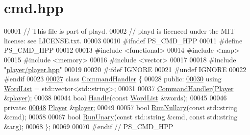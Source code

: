 \hypertarget{cmd_8hpp_source}{\section{cmd.\+hpp}
\label{cmd_8hpp_source}
}

\begin{DoxyCode}
00001 \textcolor{comment}{// This file is part of playd.}
00002 \textcolor{comment}{// playd is licenced under the MIT license: see LICENSE.txt.}
00003 
00010 \textcolor{preprocessor}{#ifndef PS\_CMD\_HPP}
00011 \textcolor{preprocessor}{#define PS\_CMD\_HPP}
00012 
00013 \textcolor{preprocessor}{#include <functional>}
00014 \textcolor{preprocessor}{#include <map>}
00015 \textcolor{preprocessor}{#include <memory>}
00016 \textcolor{preprocessor}{#include <vector>}
00017 
00018 \textcolor{preprocessor}{#include "\hyperlink{player_8hpp}{player/player.hpp}"}
00019 
00020 \textcolor{preprocessor}{#ifdef IGNORE}
00021 \textcolor{preprocessor}{#undef IGNORE}
00022 \textcolor{preprocessor}{#endif}
00023 
\hypertarget{cmd_8hpp_source_l00027}{}\hyperlink{classCommandHandler}{00027} \textcolor{keyword}{class }\hyperlink{classCommandHandler}{CommandHandler} \{
00028 \textcolor{keyword}{public}:
\hypertarget{cmd_8hpp_source_l00030}{}\hyperlink{classCommandHandler_ae6cc650f171966041b385c8a4a766639}{00030}     \textcolor{keyword}{using} \hyperlink{classCommandHandler_ae6cc650f171966041b385c8a4a766639}{WordList} = std::vector<std::string>;
00031 
00037     \hyperlink{classCommandHandler_ae4d47b90e2cf2ab6d514576fedeb2192}{CommandHandler}(\hyperlink{classPlayer}{Player} &\hyperlink{classCommandHandler_a398ba97a0625f5fbc3ced6679cfd3766}{player});
00038 
00044     \textcolor{keywordtype}{bool} \hyperlink{classCommandHandler_abc1ad0dfbff50db168d0a65cf05b169e}{Handle}(\textcolor{keyword}{const} \hyperlink{classCommandHandler_ae6cc650f171966041b385c8a4a766639}{WordList} &words);
00045 
00046 \textcolor{keyword}{private}:
\hypertarget{cmd_8hpp_source_l00048}{}\hyperlink{classCommandHandler_a398ba97a0625f5fbc3ced6679cfd3766}{00048}     \hyperlink{classPlayer}{Player} &\hyperlink{classCommandHandler_a398ba97a0625f5fbc3ced6679cfd3766}{player};
00049 
00057     \textcolor{keywordtype}{bool} \hyperlink{classCommandHandler_a22ac65683643c6f6037441a8e5fd04d4}{RunNullary}(\textcolor{keyword}{const} std::string &cmd);
00058 
00067     \textcolor{keywordtype}{bool} \hyperlink{classCommandHandler_a75904aa3532bba1e548fbcff00544d46}{RunUnary}(\textcolor{keyword}{const} std::string &cmd, \textcolor{keyword}{const} std::string &arg);
00068 \};
00069 
00070 \textcolor{preprocessor}{#endif // PS\_CMD\_HPP}
\end{DoxyCode}
